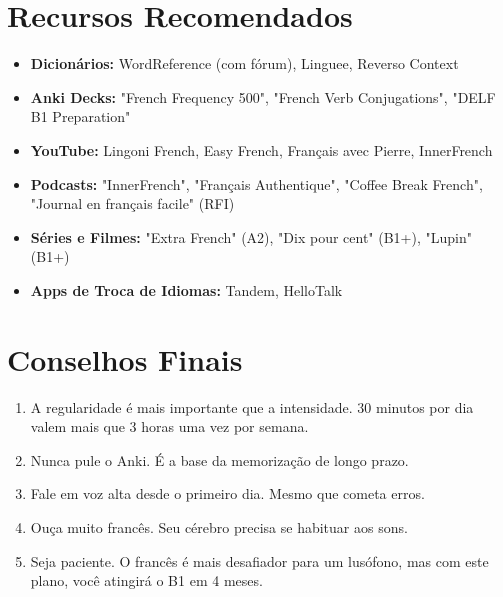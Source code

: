 \documentclass[a4paper,12pt]{article}
\begin{document}
\section{Recursos Recomendados}
\begin{itemize}
    \item \textbf{Dicionários:} WordReference (com fórum), Linguee, Reverso Context
    \item \textbf{Anki Decks:} "French Frequency 500", "French Verb Conjugations", "DELF B1 Preparation"
    \item \textbf{YouTube:} Lingoni French, Easy French, Français avec Pierre, InnerFrench
    \item \textbf{Podcasts:} "InnerFrench", "Français Authentique", "Coffee Break French", "Journal en français facile" (RFI)
    \item \textbf{Séries e Filmes:} "Extra French" (A2), "Dix pour cent" (B1+), "Lupin" (B1+)
    \item \textbf{Apps de Troca de Idiomas:} Tandem, HelloTalk
\end{itemize}

\section{Conselhos Finais}
\begin{enumerate}
    \item A regularidade é mais importante que a intensidade. 30 minutos por dia valem mais que 3 horas uma vez por semana.
    \item Nunca pule o Anki. É a base da memorização de longo prazo.
    \item Fale em voz alta desde o primeiro dia. Mesmo que cometa erros.
    \item Ouça muito francês. Seu cérebro precisa se habituar aos sons.
    \item Seja paciente. O francês é mais desafiador para um lusófono, mas com este plano, você atingirá o B1 em 4 meses.
\end{enumerate}
\end{document}
